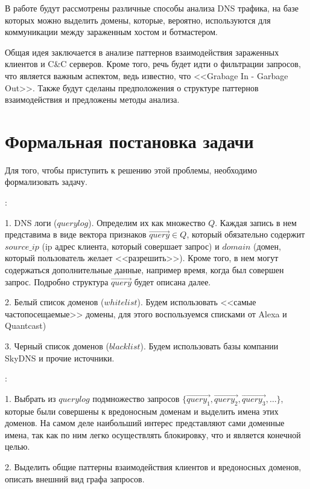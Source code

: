 \documentclass[a4paper,14pt]{extreport} %
\begin{document}
В работе будут рассмотрены различные способы анализа DNS трафика, на базе которых можно выделить домены, которые, вероятно, используются для коммуникации между зараженным хостом и ботмастером.

Общая идея заключается в анализе паттернов взаимодействия зараженных клиентов и C\&C серверов. Кроме того, речь будет идти о фильтрации запросов, что является важным аспектом, ведь известно, что <<Grabage In - Garbage Out>>. Также будут сделаны предположения о структуре паттернов взаимодействия и предложены методы анализа.

\chapter{Формальная постановка задачи}
Для того, чтобы приступить к решению этой проблемы, необходимо формализовать задачу.

{:}
		
1. DNS логи ($querylog$). Определим их как множество $Q$. Каждая запись в нем представима в виде вектора признаков $\vec{query}$$\in$$Q$, который обязательно содержит $source\_ip$ (ip адрес клиента, который совершает запрос) и $domain$ (домен, который пользователь желает <<разрешить>>). Кроме того, в нем могут содержаться дополнительные данные, например время, когда был совершен запрос. Подробно структура $\vec{query}$ будет описана далее.
		
2. Белый список доменов ($whitelist$). Будем использовать <<самые частопосещаемые>> домены, для этого воспользуемся списками от Alexa и Quantcast)
		
3. Черный список доменов ($blacklist$). Будем использовать базы компании SkyDNS и прочие источники.
	
{:} 
	
1. Выбрать из $querylog$ подмножество 
запросов $\{\vec{query_1}, \vec{query_2}, \vec{query_3}, \dots\}$, которые были совершены к вредоносным доменам и выделить имена этих доменов. На самом деле наибольший интерес представляют сами доменные имена, так как по ним легко осуществлять блокировку, что и является конечной целью.
	
2. Выделить общие паттерны взаимодействия клиентов и вредоносных доменов, описать внешний вид графа запросов.
	
\newpage
\end{document}

